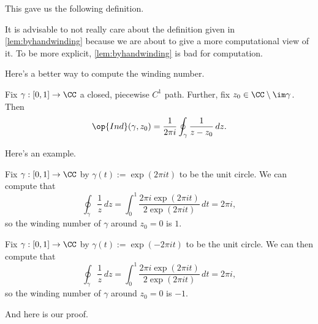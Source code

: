 This gave us the following definition.
\windingnumberdef*
\begin{remark}
	It is advisable to not really care about the definition given in \autoref{lem:byhandwinding} because we are about to give a more computational view of it. To be more explicit, \autoref{lem:byhandwinding} is bad for computation.
\end{remark}
Here's a better way to compute the winding number.
\begin{lemma} \label{lem:betterwinding}
	Fix $\gamma:[0,1]\to\CC$ a closed, piecewise $C^1$ path. Further, fix $z_0\in\CC\setminus\im\gamma$. Then
	\[\op{Ind}(\gamma,z_0)=\frac1{2\pi i}\oint_\gamma\frac1{z-z_0}\,dz.\]
\end{lemma}
Here's an example.
\begin{example}
	Fix $\gamma:[0,1]\to\CC$ by $\gamma(t):=\exp(2\pi it)$ to be the unit circle. We can compute that
	\[\oint_\gamma\frac1z\,dz=\int_0^1\frac{2\pi i\exp(2\pi it)}{2\exp(2\pi it)}\,dt=2\pi i,\]
	so the winding number of $\gamma$ around $z_0=0$ is $1$.
\end{example}
\begin{example}
	Fix $\gamma:[0,1]\to\CC$ by $\gamma(t):=\exp(-2\pi it)$ to be the unit circle. We can then compute that
	\[\oint_\gamma\frac1z\,dz=\int_0^1\frac{2\pi i\exp(2\pi it)}{2\exp(2\pi it)}\,dt=2\pi i,\]
	so the winding number of $\gamma$ around $z_0=0$ is $-1$.
\end{example}
And here is our proof.
